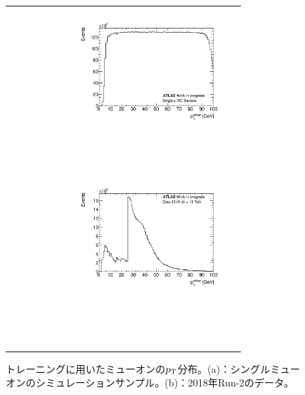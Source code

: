\begin{figure}
    \begin{tabular}{cc}
    \centering
    \begin{minipage}[b]{0.45\hsize}%
        \centering
        \hspace*{-1.5cm}
        \includegraphics[clip, width=8cm]{fig/4/MC_input_pt100.pdf}
        \subcaption{}
        \label{MC_input}
    \end{minipage}%
    \begin{minipage}[b]{0.65\hsize}%
        \centering
        \hspace*{-1cm}
        \includegraphics[clip, width=8cm]{fig/4/Data_input_pt.pdf}
        \subcaption{}
        \label{Data_input}
    \end{minipage}%
    \end{tabular}
    \caption{トレーニングに用いたミューオンの$p_{\rm{T}}$分布。(a)：シングルミューオンのシミュレーションサンプル。(b)：2018年Run-2のデータ。}
    \label{Inputdata}
\end{figure}


